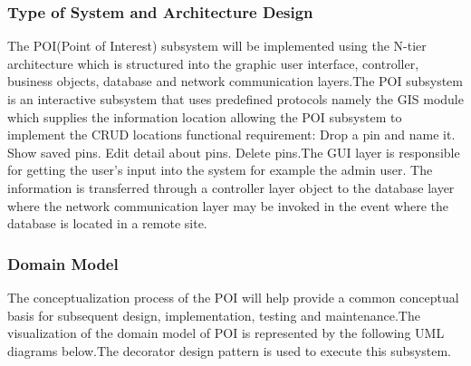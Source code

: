 \documentclass{article}
\begin{document}
 		\subsubsection{Type of System and Architecture Design}
The POI(Point of Interest) subsystem will be implemented using the N-tier architecture which is structured into the graphic user interface, controller, business objects, database and network communication layers.The POI subsystem is an interactive subsystem that uses predeﬁned protocols namely the GIS module which supplies the information location allowing the POI subsystem to implement the CRUD locations functional requirement: Drop a pin and name it. Show saved pins. Edit detail about pins. Delete pins.The GUI layer is responsible for getting the user’s input into the system for example the admin user. The information is transferred through a controller layer object to the database layer where the network communication layer may be invoked in the event where the database is located in a remote site.

		\subsubsection{Domain Model }
The conceptualization process of the POI will help provide a common conceptual basis for subsequent design, implementation, testing and maintenance.The visualization of the domain model of POI is represented by the following UML diagrams below.The decorator design pattern  is used to execute this subsystem.
\end{document}
